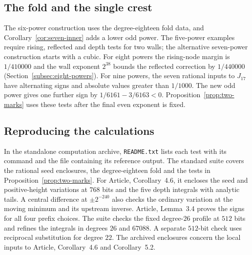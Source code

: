 \subsection{The fold and the single crest}\label{subsec:finite-crest}
The six-power construction uses the degree-eighteen fold data, and
Corollary~\ref{cor:seven-inner} adds a lower odd power. The five-power
examples require rising, reflected and depth tests for two walls;
the alternative seven-power construction starts with a cubic.
For eight powers the rising-node margin is $1/410000$ and the wall
exponent $2^{38}$ bounds the reflected correction by $1/440000$
(Section~\ref{subsec:eight-powers}). For nine powers, the seven rational
inputs to $J_{17}$ have alternating signs and absolute values greater
than $1/1000$. The new odd power gives one further sign by
$1/6161-3/6163<0$. Proposition~\ref{prop:two-marks} uses these tests
after the final even exponent is fixed.

\subsection{Reproducing the calculations}\label{subsec:replay}
In the standalone computation archive, \texttt{README.txt} lists each
test with its command and the file containing its reference output.
The standard suite covers the rational seed enclosures, the
degree-eighteen fold and the tests in Proposition~\ref{prop:two-marks}.
For Article, Corollary~4.6, it encloses the seed and positive-height
variations at $768$ bits and the five depth integrals with analytic
tails. A central difference at $\pm2^{-240}$ also checks the ordinary
variation at the moving minimum and its upstream inverse. Article,
Lemma~3.4 proves the signs for all four prefix choices. The suite
checks the fixed degree-$26$ profile at $512$ bits and refines the
integrals in degrees $26$ and $67088$. A separate $512$-bit check uses
reciprocal substitution for degree $22$.
The archived enclosures concern the local inputs to Article,
Corollary~4.6 and Corollary~5.2.

